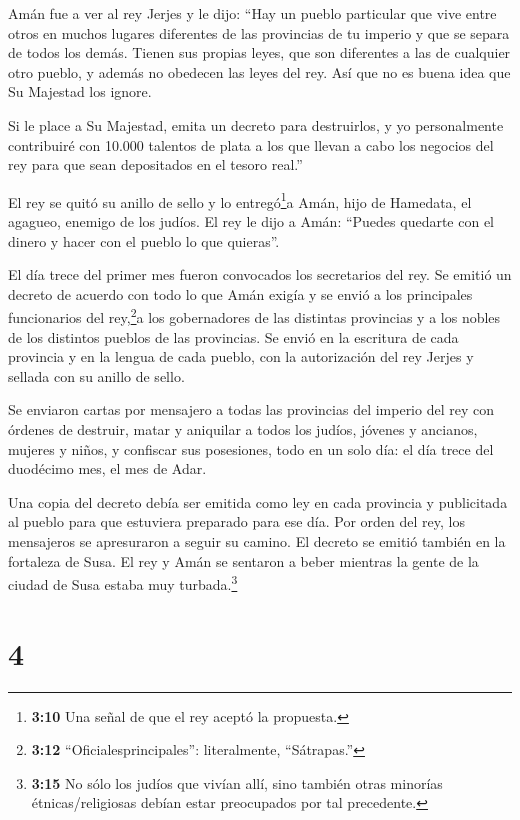  Amán fue a ver al rey Jerjes y le dijo: ``Hay un pueblo
particular que vive entre otros en muchos lugares diferentes de las
provincias de tu imperio y que se separa de todos los demás. Tienen sus
propias leyes, que son diferentes a las de cualquier otro pueblo, y
además no obedecen las leyes del rey. Así que no es buena idea que Su
Majestad los ignore.

 Si le place a Su Majestad, emita un decreto para
destruirlos, y yo personalmente contribuiré con 10.000 talentos de plata
a los que llevan a cabo los negocios del rey para que sean depositados
en el tesoro real.''

 El rey se quitó su anillo de sello y lo
entregó\footnote{\textbf{3:10} Una señal de que el rey aceptó la
  propuesta.}a Amán, hijo de Hamedata, el agagueo, enemigo de los
judíos.  El rey le dijo a Amán: ``Puedes quedarte con el
dinero y hacer con el pueblo lo que quieras''.

 El día trece del primer mes fueron convocados los
secretarios del rey. Se emitió un decreto de acuerdo con todo lo que
Amán exigía y se envió a los principales funcionarios del
rey,\footnote{\textbf{3:12} ``Oficialesprincipales'': literalmente,
  ``Sátrapas.''}a los gobernadores de las distintas provincias y a los
nobles de los distintos pueblos de las provincias. Se envió en la
escritura de cada provincia y en la lengua de cada pueblo, con la
autorización del rey Jerjes y sellada con su anillo de sello.

 Se enviaron cartas por mensajero a todas las provincias
del imperio del rey con órdenes de destruir, matar y aniquilar a todos
los judíos, jóvenes y ancianos, mujeres y niños, y confiscar sus
posesiones, todo en un solo día: el día trece del duodécimo mes, el mes
de Adar.

 Una copia del decreto debía ser emitida como ley en cada
provincia y publicitada al pueblo para que estuviera preparado para ese
día.  Por orden del rey, los mensajeros se apresuraron a
seguir su camino. El decreto se emitió también en la fortaleza de Susa.
El rey y Amán se sentaron a beber mientras la gente de la ciudad de Susa
estaba muy turbada.\footnote{\textbf{3:15} No sólo los judíos que vivían
  allí, sino también otras minorías étnicas/religiosas debían estar
  preocupados por tal precedente.}

\hypertarget{section-3}{%
\section{4}\label{section-3}}

